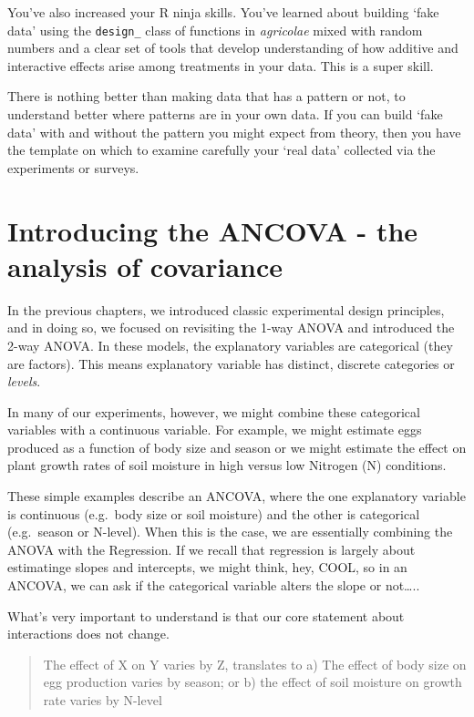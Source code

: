\documentclass[
]{book}
\begin{document}
You've also increased your R ninja skills. You've learned about building `fake data' using the \texttt{design\_} class of functions in \emph{agricolae} mixed with random numbers and a clear set of tools that develop understanding of how additive and interactive effects arise among treatments in your data. This is a super skill.

There is nothing better than making data that has a pattern or not, to understand better where patterns are in your own data. If you can build `fake data' with and without the pattern you might expect from theory, then you have the template on which to examine carefully your `real data' collected via the experiments or surveys.

\hypertarget{introducing-the-ancova---the-analysis-of-covariance}{%
\chapter{Introducing the ANCOVA - the analysis of covariance}\label{introducing-the-ancova---the-analysis-of-covariance}}

In the previous chapters, we introduced classic experimental design principles, and in doing so, we focused on revisiting the 1-way ANOVA and introduced the 2-way ANOVA. In these models, the explanatory variables are categorical (they are factors). This means explanatory variable has distinct, discrete categories or \emph{levels}.

In many of our experiments, however, we might combine these categorical variables with a continuous variable. For example, we might estimate eggs produced as a function of body size and season or we might estimate the effect on plant growth rates of soil moisture in high versus low Nitrogen (N) conditions.

These simple examples describe an ANCOVA, where the one explanatory variable is continuous (e.g.~body size or soil moisture) and the other is categorical (e.g.~season or N-level). When this is the case, we are essentially combining the ANOVA with the Regression. If we recall that regression is largely about estimatinge slopes and intercepts, we might think, hey, COOL, so in an ANCOVA, we can ask if the categorical variable alters the slope or not\ldots..

What's very important to understand is that our core statement about interactions does not change.

\begin{quote}
The effect of X on Y varies by Z, translates to a) The effect of body size on egg production varies by season; or b) the effect of soil moisture on growth rate varies by N-level
\end{quote}
\end{document}
